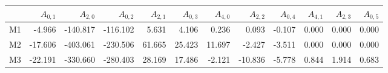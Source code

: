 \begin{tabular}{rrrrrrrrrrrr}
\toprule
 & $A_{0,1}$ & $A_{2,0}$ & $A_{0,2}$ & $A_{2,1}$ & $A_{0,3}$ & $A_{4,0}$ & $A_{2,2}$ & $A_{0,4}$ & $A_{4,1}$ & $A_{2,3}$ & $A_{0,5}$\\
\midrule
M1 & -4.966 & -140.817 & -116.102 & 5.631 & 4.106 & 0.236 & 0.093 & -0.107 & 0.000 & 0.000 & 0.000\\
M2 & -17.606 & -403.061 & -230.506 & 61.665 & 25.423 & 11.697 & -2.427 & -3.511 & 0.000 & 0.000 & 0.000\\
M3 & -22.191 & -330.660 & -280.403 & 28.169 & 17.486 & -2.121 & -10.836 & -5.778 & 0.844 & 1.914 & 0.683\\
\bottomrule\end{tabular}